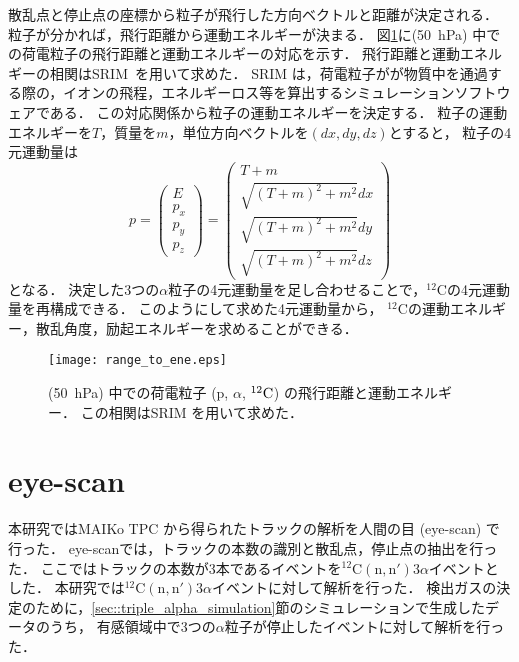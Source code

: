\documentclass[../master]{subfiles}
\begin{document}
散乱点と停止点の座標から粒子が飛行した方向ベクトルと距離が決定される．
粒子が分かれば，飛行距離から運動エネルギーが決まる．
図\ref{fig::range_to_ene_alpha}に\Methane (\SI{50}{\hecto\pascal}) 中での荷電粒子の飛行距離と運動エネルギーの対応を示す．
飛行距離と運動エネルギーの相関はSRIM~\cite{SRIM}を用いて求めた．
SRIM は，荷電粒子がが物質中を通過する際の，イオンの飛程，エネルギーロス等を算出するシミュレーションソフトウェアである．
この対応関係から粒子の運動エネルギーを決定する．
粒子の運動エネルギーを$T$，質量を$m$，単位方向ベクトルを$(dx, dy, dz)$とすると，
粒子の4元運動量は
\begin{equation}
  p =
  \begin{pmatrix}
    E \\ p_{x} \\ p_{y} \\ p_{z}
  \end{pmatrix}
  =
  \begin{pmatrix}
    T + m \\ \sqrt{(T+m)^2 + m^2} dx \\ \sqrt{(T+m)^2 + m^2} dy \\ \sqrt{(T+m)^2 + m^2} dz
  \end{pmatrix}
  \label{eq::momentum_vector}
\end{equation}
となる．
決定した3つの$\alpha$粒子の4元運動量を足し合わせることで，${}^{12}\mathrm{C}$の4元運動量を再構成できる．
このようにして求めた4元運動量から，
${}^{12}\mathrm{C}$の運動エネルギー，散乱角度，励起エネルギーを求めることができる．
\begin{figure}
  \centering
  \texttt{[image: range\_to\_ene.eps]}
  \caption[\Methane (\SI{50}{\hecto\pascal}) 中での荷電粒子 (p, $\alpha$, ${}^{12}\rm{C}$) の飛行距離と運動エネルギー．]
          {\Methane (\SI{50}{\hecto\pascal}) 中での荷電粒子 (p, $\alpha$, ${}^{12}\rm{C}$) の飛行距離と運動エネルギー．
            この相関はSRIM を用いて求めた．
          }
  \label{fig::range_to_ene_alpha}
\end{figure}


\section{eye-scan}
本研究ではMAIKo TPC から得られたトラックの解析を人間の目 (eye-scan) で行った．
eye-scanでは，トラックの本数の識別と散乱点，停止点の抽出を行った．
ここではトラックの本数が3本であるイベントを${}^{12}\mathrm{C}(\mathrm{n},\mathrm{n}')3\alpha$イベントとした．
本研究では${}^{12}\mathrm{C}(\mathrm{n},\mathrm{n}')3\alpha$イベントに対して解析を行った．
検出ガスの決定のために，\ref{sec::triple_alpha_simulation}節のシミュレーションで生成したデータのうち，
有感領域中で3つの$\alpha$粒子が停止したイベントに対して解析を行った．
\end{document}
